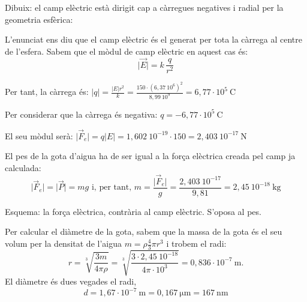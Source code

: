 \begin{solapartat}
 Dibuix: el camp elèctric està dirigit cap a càrregues negatives i radial per la geometria esfèrica:


 L'enunciat ens diu que el camp elèctric és el generat per tota la càrrega al centre de l'esfera. Sabem que el mòdul de camp elèctric en aquest cas és:
\[ \bigl|\vec{E}\bigr| = k\,\frac{q}{r^2} \]

 Per tant, la càrrega és: \quad $|q| = \frac{|E|r^2}{k} = \frac{150\cdot(6,37\ 10^{6})^2}{8,99\ 10^{9}} = 6,77\cdot 10^{5}\ \mathrm{C}$

 Per considerar que la càrrega és negativa: $q = -6,77\cdot 10^{5}\ \mathrm{C}$
\end{solapartat}

\begin{solapartat}
 El seu mòdul serà: $\bigl|\vec{F}_e\bigr| = q|E| = 1,602\ 10^{-19}\cdot 150 = 2,403\ 10^{-17}\ \mathrm{N}$

 El pes de la gota d'aigua ha de ser igual a la força elèctrica creada pel camp ja calculada:
\[ \bigl|\vec{F}_e\bigr| = \bigl|\vec{P}\bigr| = mg \text{ i, per tant, } m = \frac{\bigl|\vec{F}_e\bigr|}{g} = \frac{2,403\ 10^{-17}}{9,81} = 2,45\ 10^{-18}\ \mathrm{kg} \]

 Esquema: la força elèctrica, contrària al camp elèctric. S'oposa al pes.


 Per calcular el diàmetre de la gota, sabem que la massa de la gota és el seu volum per la densitat de l'aigua $m = \rho\frac{4}{3}\pi r^3$ i trobem el radi:
\[ r = \sqrt[3]{\frac{3m}{4\pi\rho}} = \sqrt[3]{\frac{3\cdot 2,45\ 10^{-18}}{4\pi\cdot 10^{3}}} = 0,836\cdot 10^{-7}\ \mathrm{m}. \]
El diàmetre és dues vegades el radi,
\[ d = 1,67\cdot 10^{-7}\ \mathrm{m} = 0,167\ \mathrm{\mu m} = 167\ \mathrm{nm} \]
\end{solapartat}
